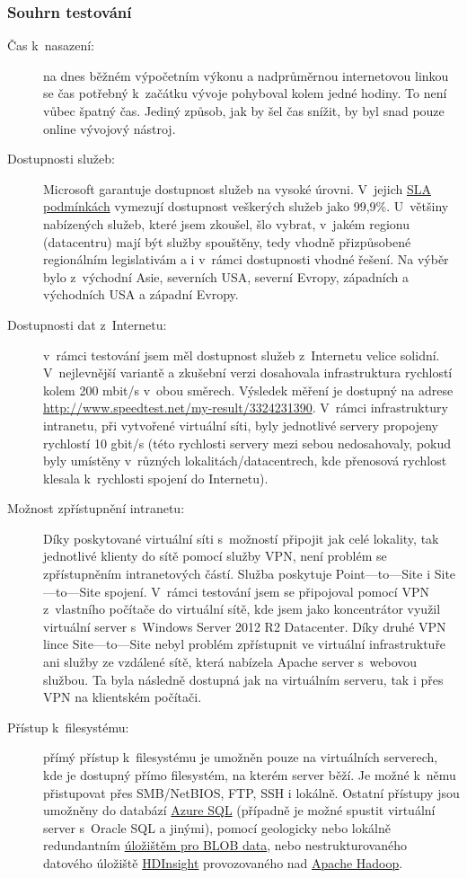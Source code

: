 \subsubsection{Souhrn testování}
\begin{description}
	\item [Čas k~nasazení:] na dnes běžném výpočetním výkonu a nadprůměrnou internetovou linkou se čas potřebný k~začátku vývoje pohyboval kolem jedné hodiny. To není vůbec špatný čas. Jediný způsob, jak by šel čas snížit, by byl snad pouze online vývojový nástroj.
	\item [Dostupnosti služeb:] Microsoft garantuje dostupnost služeb na vysoké úrovni. V~jejich \href{http://www.windowsazure.com/en-us/support/legal/sla/}{SLA podmínkách\cite{azure:sla}} vymezují dostupnost veškerých služeb jako 99,9\%. U~většiny nabízených služeb, které jsem zkoušel, šlo vybrat, v~jakém regionu (datacentru) mají být služby spouštěny, tedy vhodně přizpůsobené regionálním legislativám a i v~rámci dostupnosti vhodné řešení. Na výběr bylo z~východní Asie, severních USA, severní Evropy, západních a východních USA a západní Evropy.
	\item [Dostupnosti dat z~Internetu:] v~rámci testování jsem měl dostupnost služeb z~Internetu velice solidní. V~nejlevnější variantě a zkušební verzi dosahovala infrastruktura rychlostí kolem 200 mbit/s v~obou směrech. Výsledek měření je dostupný na adrese \href{http://www.speedtest.net/my-result/3324231390}{http://www.speedtest.net/my-result/3324231390}. V~rámci infrastruktury intranetu, při vytvořené virtuální síti, byly jednotlivé servery propojeny rychlostí 10 gbit/s (této rychlosti servery mezi sebou nedosahovaly, pokud byly umístěny v~různých lokalitách/datacentrech, kde přenosová rychlost klesala k~rychlosti spojení do Internetu).
	\item [Možnost zpřístupnění intranetu:] Díky poskytované virtuální síti s~možností připojit jak celé lokality, tak jednotlivé klienty do sítě pomocí služby VPN, není problém se zpřístupněním intranetových částí. Služba poskytuje Point---to---Site i Site---to---Site spojení. V~rámci testování jsem se připojoval pomocí VPN z~vlastního počítače do virtuální sítě, kde jsem jako koncentrátor využil virtuální server s~Windows Server 2012 R2 Datacenter. Díky druhé VPN lince Site---to---Site nebyl problém zpřístupnit ve virtuální infrastruktuře ani služby ze vzdálené sítě, která nabízela Apache server s~webovou službou. Ta byla následně dostupná jak na virtuálním serveru, tak i přes VPN na klientském počítači.
	\item [Přístup k~filesystému:] přímý přístup k~filesystému je umožněn pouze na virtuálních serverech, kde je dostupný přímo filesystém, na kterém server běží. Je možné k~němu přistupovat přes SMB/NetBIOS, FTP, SSH i lokálně. Ostatní přístupy jsou umožněny do databází \href{http://www.windowsazure.com/en-us/services/sql-database/}{Azure SQL} (případně je možné spustit virtuální server s~Oracle SQL a jinými), pomocí geologicky nebo lokálně redundantním \href{http://www.windowsazure.com/en-us/services/storage/}{úložištěm pro BLOB data}, nebo nestrukturovaného datového úložiště \href{http://www.windowsazure.com/en-us/services/hdinsight/}{HDInsight} provozovaného nad \href{http://hadoop.apache.org/}{Apache Hadoop}.

\end{description}
